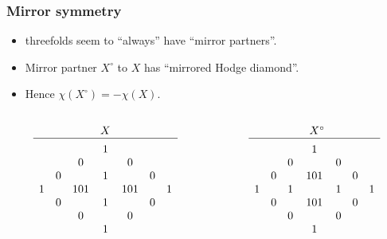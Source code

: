 \begin{frame}
\frametitle{Mirror symmetry}

\begin{itemize}[<+->]
	\item
    \CY threefolds seem to ``always'' have ``mirror partners''.

	\item
    Mirror partner $X^\circ$ to $X$ has ``mirrored Hodge diamond''.

	\item
    Hence $\chi(X^\circ) = - \chi(X)$.
\end{itemize}

\unskip
\begin{columns}[onlytextwidth]
    {
        \begin{column}{0.48\textwidth}
            \[
                \begin{array}[c]{ccccccc}
                    &&& X                    \\
                    \hline                   \\[-1.8ex]
                    &&& 1                    \\
                    &&  0 && 0               \\
                    &   0 && 1   && 0        \\
                        1 && 101 && 101 && 1 \\
                    &   0 && 1   && 0        \\
                    &&  0 && 0               \\
                    &&& 1
                \end{array}
            \]
        \end{column}
    }

    {
        \begin{column}{0.48\textwidth}
            \[
                \begin{array}[c]{ccccccc}
                    &&& \phantom{^\circ}X^\circ \\
                    \hline                      \\[-1.8ex]
                    &&& 1                       \\  
                    &&  0 && 0                  \\
                    &   0 && 101 && 0           \\
                        1 && 1   && 1 && 1      \\
                    &   0 && 101 && 0           \\
                    &&  0 && 0                  \\
                    &&& 1
                \end{array}
            \]
        \end{column}
    }
\end{columns}

\end{frame}


